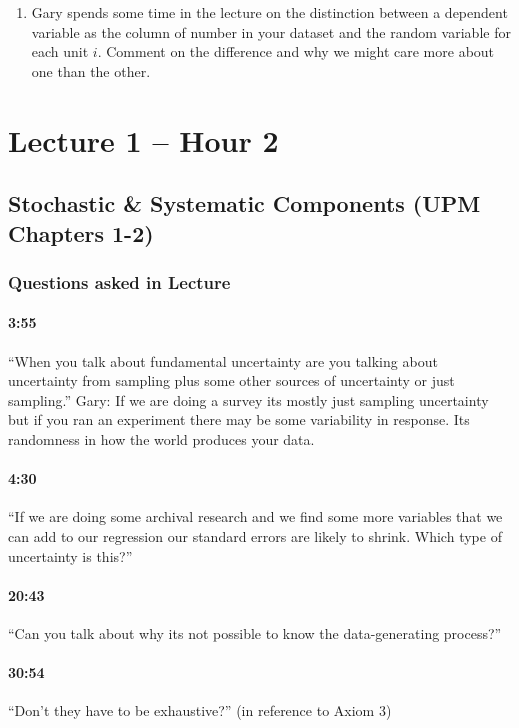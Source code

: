 \documentclass[11pt]{article}
\begin{document}
\begin{enumerate}
\item Gary spends some time in the lecture on the distinction between a dependent variable as the column of number in your dataset and the random variable for each unit $i$.  Comment on the difference and why we might care more about one than the other. 
\end{enumerate}


\section{Lecture 1 -- Hour 2}

\subsection{Stochastic \& Systematic Components (UPM Chapters 1-2)}

\subsubsection{Questions asked in Lecture}

\paragraph{3:55} ``When you talk about fundamental uncertainty are you talking about uncertainty from sampling plus some other sources of uncertainty or just sampling.''
Gary: If we are doing a survey its mostly just sampling uncertainty but if you ran an experiment there may be some variability in response.  Its randomness in how the world produces your data.
\paragraph{4:30}  ``If we are doing some archival research and we find some more variables that we can add to our regression our standard errors are likely to shrink.  Which type of uncertainty is this?''
\paragraph{20:43} ``Can you talk about why its not possible to know the data-generating process?'' 
\paragraph{30:54} ``Don't they have to be exhaustive?'' (in reference to Axiom 3)
\end{document}
